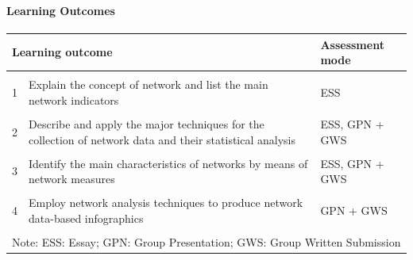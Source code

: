\documentclass[8pt]{beamer}
\begin{document}

\begin{frame}
\frametitle{\insertsection}
\framesubtitle{Learning Outcomes}

\centering
\begin{tabular}{lp{5.5cm}l}
\toprule
\multicolumn{2}{l}{\textbf{Learning outcome}} & \textbf{Assessment mode}\\
\hline
\\
1 & 
Explain the concept of network and list the main network indicators & 
ESS\\
\\
2 & 
Describe and apply the major techniques for the collection of network data and their statistical analysis & 
ESS, GPN + GWS\\
\\
3 & 
Identify the main characteristics of networks by means of network measures  & 
ESS, GPN + GWS\\
\\
4 &
Employ network analysis techniques to produce network data-based infographics & 
GPN + GWS\\
\\
\bottomrule
\multicolumn{3}{l}{\scriptsize Note: ESS: Essay; GPN: Group Presentation; GWS: Group Written Submission}\\
\end{tabular}

\end{frame}



\bgroup
{}
\begin{frame}[plain]{}
\begin{center}
\color{white}{\LARGE This is what you will learn to do ...}
\end{center}
\end{frame}
\egroup
\end{document}
